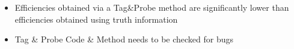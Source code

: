 \documentclass{beamer}
\begin{document}
\begin{frame}
\begin{columns}
\begin{column}{0.33\textwidth}
   \end{column}
  \end{columns}
\begin{itemize}
 \item Efficiencies obtained via a Tag\&Probe method are significantly lower than efficiencies obtained using truth information
 \item Tag \& Probe Code \& Method needs to be checked for bugs
\end{itemize}
\end{frame}
\end{document}
